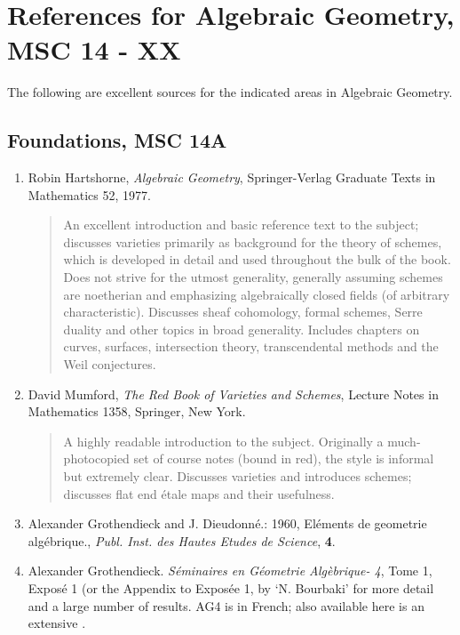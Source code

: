 \documentclass[12pt]{article}
\begin{document}
\section*{References for Algebraic Geometry, MSC 14 - XX}

The following are excellent sources for the indicated areas in Algebraic Geometry.

\subsection*{Foundations, MSC 14A}
\begin{enumerate}
\item Robin Hartshorne, \emph{Algebraic Geometry}, Springer-Verlag Graduate Texts in Mathematics 52, 1977. 
\begin{quote} An excellent introduction and basic reference text to the subject; discusses varieties primarily as background for the theory of schemes, which is developed in detail and used throughout the bulk of the book.  Does not strive for the utmost generality, generally assuming schemes are noetherian and emphasizing algebraically closed fields (of arbitrary characteristic).  Discusses sheaf cohomology, formal schemes, Serre duality and other topics in broad generality. Includes chapters on curves, surfaces, intersection theory, transcendental methods and the Weil conjectures.
\end{quote}
\item David Mumford, \emph{The Red Book of Varieties and Schemes}, Lecture Notes in Mathematics 1358, Springer, New York.  
\begin{quote}
A highly readable introduction to the subject.  Originally a much-photocopied set of course notes (bound in red), the style is informal but extremely clear.  Discusses varieties and introduces schemes; discusses flat end \'etale maps and their usefulness.
\end{quote}

\item Alexander Grothendieck and J. Dieudonn\'{e}.: 1960, El\'{e}ments de geometrie alg\'{e}brique., \emph{Publ. Inst. des Hautes Etudes de Science}, \textbf{4}.

\item Alexander Grothendieck. \emph{S\'eminaires en G\'eometrie Alg\`ebrique- 4}, Tome 1, Expos\'e 1 
(or the Appendix to Expos\'ee 1, by `N. Bourbaki' for more detail and a large number of results.
AG4 is  in French;
also available here is an extensive 
.


\end{enumerate}
\end{document}
